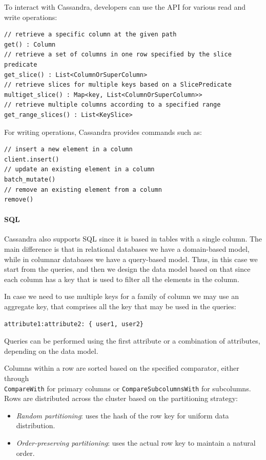 To interact with Cassandra, developers can use the API for various read and write operations:
\begin{lstlisting}[style=Java]
// retrieve a specific column at the given path
get() : Column
// retrieve a set of columns in one row specified by the slice predicate
get_slice() : List<ColumnOrSuperColumn>
// retrieve slices for multiple keys based on a SlicePredicate
multiget_slice() : Map<key, List<ColumnOrSuperColumn>>
// retrieve multiple columns according to a specified range
get_range_slices() : List<KeySlice>
\end{lstlisting}
For writing operations, Cassandra provides commands such as:
\begin{lstlisting}[style=Java]
// insert a new element in a column
client.insert()
// update an existing element in a column
batch_mutate()
// remove an existing element from a column
remove()
\end{lstlisting}

\paragraph*{SQL}
Cassandra also supports SQL since it is based in tables with a single column.
The main difference is that in relational databases we have a domain-based model, while in columnar databases we have a query-based model. 
Thus, in this case we start from the queries, and then we design the data model based on that since each column has a key that is used to filter all the elements in the column. 

In case we need to use multiple keys for a family of column we may use an aggregate key, that comprises all the key that may be used in the queries: 
\begin{lstlisting}[style=C]
attribute1:attribute2: { user1, user2}
\end{lstlisting}
Queries can be performed using the first attribute or a combination of attributes, depending on the data model.

Columns within a row are sorted based on the specified comparator, either through \\ \texttt{CompareWith} for primary columns or \texttt{CompareSubcolumnsWith} for subcolumns.
Rows are distributed across the cluster based on the partitioning strategy:
\begin{itemize}
    \item \textit{Random partitioning}: uses the hash of the row key for uniform data distribution.
    \item \textit{Order-preserving partitioning}: uses the actual row key to maintain a natural order.
\end{itemize}